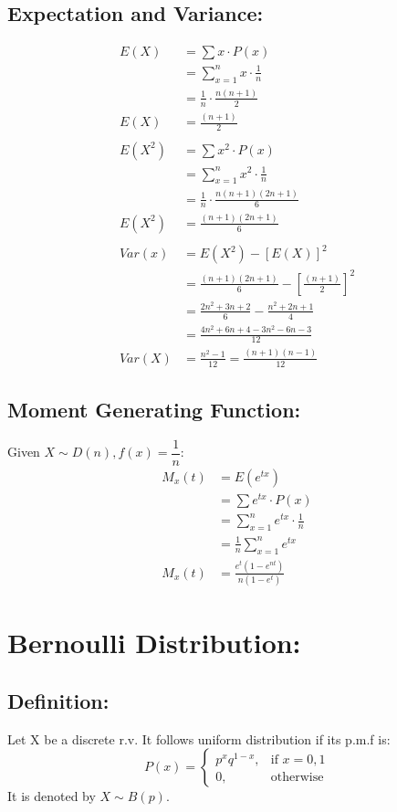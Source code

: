 \documentclass[
10pt, %
a4paper, %
]{report}
\begin{document}
\subsection*{Expectation and Variance:}
\begin{align*}
    E(X) &= \sum x \cdot P(x) \\
         &= \sum_{x=1}^n x\cdot\frac{1}{n} \\
         &= \frac{1}{n} \cdot \frac{n(n+1)}{2} \\
    E(X) &= \frac{(n+1)}{2} \\ \\
    E(X^2) &= \sum x^2 \cdot P(x) \\
           &= \sum_{x=1}^n x^2\cdot\frac{1}{n} \\
           &= \frac{1}{n} \cdot \frac{n(n+1)(2n+1)}{6} \\
    E(X^2) &= \frac{(n+1)(2n+1)}{6} \\ \\
    Var(x) &= E(X^2) - [E(X)]^2 \\
           &= \frac{(n+1)(2n+1)}{6} - \left[\frac{(n+1)}{2}\right]^2 \\
           &= \frac{2n^2+3n+2}{6}-\frac{n^2+2n+1}{4} \\
           &= \frac{4n^2+6n+4-3n^2-6n-3}{12} \\
    Var(X) &= \frac{n^2-1}{12} = \frac{(n+1)(n-1)}{12}
\end{align*}
\newpage

\subsection*{Moment Generating Function:}
Given \(X \sim D(n), f(x)=\dfrac{1}{n}:\)
\begin{align*}
    M_x(t) &= E(e^{tx}) \\
           &= \sum e^{tx} \cdot P(x) \\
           &= \sum_{x=1}^n e^{tx} \cdot \frac{1}{n} \\
           &= \frac{1}{n} \sum_{x=1}^n e^{tx} \\
    M_x(t) &= \frac{e^t(1-e^{nt})}{n(1-e^t)}
\end{align*}


\newpage

\section*{Bernoulli Distribution:}
\subsection*{Definition:}
Let X be a discrete r.v. It follows uniform distribution if its p.m.f is:
\[
    P(x)= 
\begin{cases}
    p^x q^{1-x},    & \text{if } x = 0,1\\
    0,              & \text{otherwise}
\end{cases}
\]
It is denoted by \(X \sim B(p).\)
\end{document}
